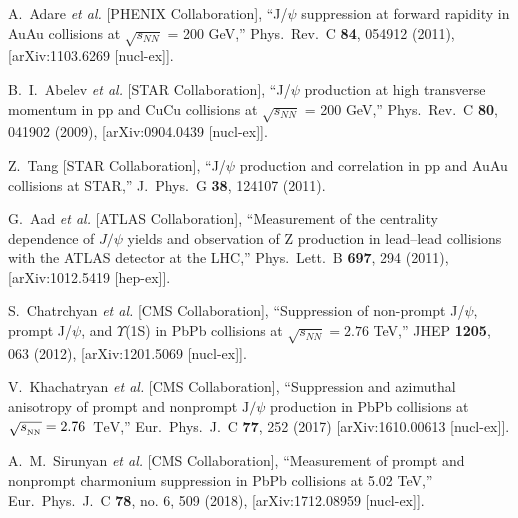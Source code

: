 \documentclass[12pt,a4paper,final]{iopart} %
\newcommand{\Jpsi}{J/\psi}
\begin{document}
\begin{thebibliography}{100}
A.~Adare {\it et al.}  [PHENIX Collaboration],
  ``J/$\psi$ suppression at forward rapidity in AuAu collisions at $\sqrt{s_{NN}}$ = 200 GeV,''
  Phys.\ Rev.\ C {\bf 84}, 054912 (2011), [arXiv:1103.6269 [nucl-ex]].

  B.~I.~Abelev {\it et al.} [STAR Collaboration],
  ``J/$\psi$ production at high transverse momentum in pp and CuCu collisions at  $\sqrt{s_{NN}}$ = 200 GeV,''
  Phys.\ Rev.\ C {\bf 80}, 041902 (2009), [arXiv:0904.0439 [nucl-ex]].

  Z.~Tang [STAR Collaboration],
  ``J/$\psi$ production and correlation in pp and AuAu collisions at STAR,''
  J.\ Phys.\ G {\bf 38}, 124107 (2011).

  
  G.~Aad {\it et al.} [ATLAS Collaboration],
  ``Measurement of the centrality dependence of $\Jpsi$ yields and observation of Z production in 
  lead–lead collisions with the ATLAS detector at the LHC,''
  Phys.\ Lett.\ B {\bf 697}, 294 (2011), [arXiv:1012.5419 [hep-ex]].




  S.~Chatrchyan {\it et al.}  [CMS Collaboration],
  ``Suppression of non-prompt J/$\psi$, prompt J/$\psi$, and $\Upsilon$(1S) in PbPb collisions at $\sqrt{s_{NN}}=2.76$ TeV,''
  JHEP {\bf 1205}, 063 (2012), [arXiv:1201.5069 [nucl-ex]].

  V.~Khachatryan {\it et al.} [CMS Collaboration],
  ``Suppression and azimuthal anisotropy of prompt and nonprompt ${\mathrm{J}}/\psi $ production in PbPb collisions at $\sqrt{{s_{_{{\rm NN}}}}} =2.76$ $\,\mathrm{TeV}$,'' Eur.\ Phys.\ J.\ C {\bf 77}, 252 (2017)
  [arXiv:1610.00613 [nucl-ex]].





  A.~M.~Sirunyan {\it et al.} [CMS Collaboration],
  ``Measurement of prompt and nonprompt charmonium suppression in PbPb collisions at 5.02 TeV,''
  Eur.\ Phys.\ J.\ C {\bf 78}, no. 6, 509 (2018),
  [arXiv:1712.08959 [nucl-ex]].




\end{thebibliography}
\end{document}
